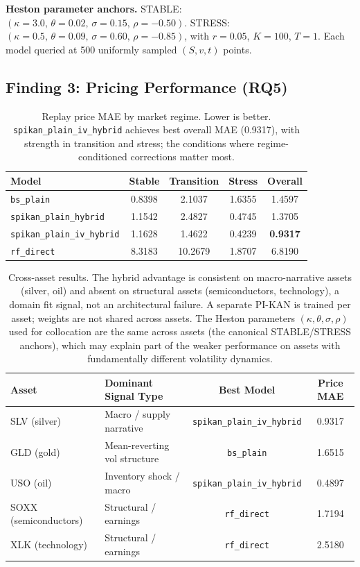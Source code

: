 \documentclass[11pt,a4paper]{article}
\begin{document}
\textbf{Heston parameter anchors.} STABLE: $(\kappa{=}3.0,\,\theta{=}0.02,\,\sigma{=}0.15,\,\rho{=}{-}0.50)$.
STRESS: $(\kappa{=}0.5,\,\theta{=}0.09,\,\sigma{=}0.60,\,\rho{=}{-}0.85)$, with
$r{=}0.05$, $K{=}100$, $T{=}1$. Each model queried at 500 uniformly sampled
$(S,v,t)$ points.

\subsection{Finding 3: Pricing Performance (RQ5)}
\label{sec:experiments:pricing}

\begin{table}[ht]
\centering
\caption{Replay price MAE by market regime. Lower is better.
\texttt{spikan\_plain\_iv\_hybrid} achieves best overall MAE (0.9317), with strength
in transition and stress; the conditions where regime-conditioned corrections
matter most.}
\begin{tabular}{@{}lcccc@{}}
\toprule
Model & Stable & Transition & Stress & Overall \\ \midrule
\texttt{bs\_plain} & 0.8398 & 2.1037 & 1.6355 & 1.4597 \\
\texttt{spikan\_plain\_hybrid} & 1.1542 & 2.4827 & 0.4745 & 1.3705 \\
\texttt{spikan\_plain\_iv\_hybrid} & 1.1628 & 1.4622 & 0.4239 & \textbf{0.9317} \\
\texttt{rf\_direct} & 8.3183 & 10.2679 & 1.8707 & 6.8190 \\
\bottomrule
\end{tabular}
\label{tab:replay}
\end{table}

\begin{table}[ht]
\centering
\caption{Cross-asset results. The hybrid advantage is consistent on macro-narrative
assets (silver, oil) and absent on structural assets (semiconductors, technology),
a domain fit signal, not an architectural failure. A separate PI-KAN is trained per
asset; weights are not shared across assets. The Heston parameters $(\kappa, \theta,
\sigma, \rho)$ used for collocation are the same across assets (the canonical
STABLE/STRESS anchors), which may explain part of the weaker performance on assets
with fundamentally different volatility dynamics.}
\begin{tabular}{@{}llcc@{}}
\toprule
Asset & Dominant Signal Type & Best Model & Price MAE \\ \midrule
SLV (silver) & Macro / supply narrative & \texttt{spikan\_plain\_iv\_hybrid} & 0.9317 \\
GLD (gold) & Mean-reverting vol structure & \texttt{bs\_plain} & 1.6515 \\
USO (oil) & Inventory shock / macro & \texttt{spikan\_plain\_iv\_hybrid} & 0.4897 \\
SOXX (semiconductors) & Structural / earnings & \texttt{rf\_direct} & 1.7194 \\
XLK (technology) & Structural / earnings & \texttt{rf\_direct} & 2.5180 \\
\bottomrule
\end{tabular}
\label{tab:cross_asset}
\end{table}
\end{document}
